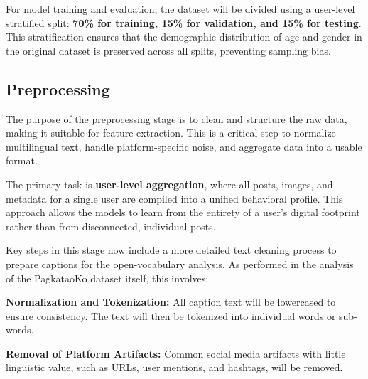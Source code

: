 
For model training and evaluation, the dataset will be divided using a user-level stratified split: \textbf{70\% for training, 15\% for validation, and 15\% for testing}. This stratification ensures that the demographic distribution of age and gender in the original dataset is preserved across all splits, preventing sampling bias.


\subsection{Preprocessing}
The purpose of the preprocessing stage is to clean and structure the raw data, making it suitable for feature extraction. This is a critical step to normalize multilingual text, handle platform-specific noise, and aggregate data into a usable format.

The primary task is \textbf{user-level aggregation}, where all posts, images, and metadata for a single user are compiled into a unified behavioral profile. This approach allows the models to learn from the entirety of a user's digital footprint rather than from disconnected, individual posts.

Key steps in this stage now include a more detailed text cleaning process to prepare captions for the open-vocabulary analysis. As performed in the analysis of the PagkataoKo dataset itself, this involves:

\textbf{Normalization and Tokenization:} All caption text will be lowercased to ensure consistency. The text will then be tokenized into individual words or sub-words.

\textbf{Removal of Platform Artifacts: }Common social media artifacts with little linguistic value, such as URLs, user mentions, and hashtags, will be removed.


